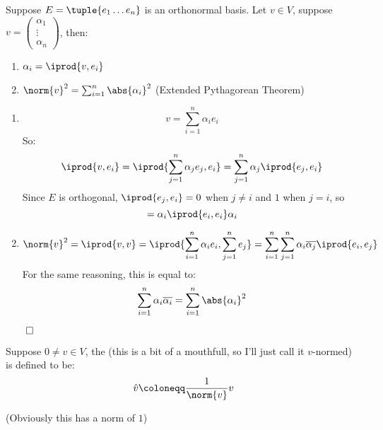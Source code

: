 \documentclass[10pt]{article}
\begin{document}
\begin{lemma}{Suppose $E=\tuple{e_1\dots e_n}$ is an orthonormal basis. Let $v\in V$, suppose $v=\begin{pmatrix}\alpha_1\\\vdots\\\alpha_n\end{pmatrix}$, then:
\begin{enumerate}
    \item $\alpha_i=\iprod{v,e_i}$
    \item $\norm{v}^2=\sum_{i=1}^n\abs{\alpha_i}^2$ (Extended Pythagorean Theorem)
\end{enumerate}}

\begin{enumerate}
    \item 
    \[ v=\sum_{i=1}^n\alpha_ie_i \]
    So:
    \[ \iprod{v,e_i}=\iprod{\sum_{j=1}^n\alpha_je_j,e_i}=\sum_{j=1}^n\alpha_j\iprod{e_j,e_i} \]
    Since $E$ is orthogonal, $\iprod{e_j,e_i}=0$ when $j\neq i$ and $1$ when $j=i$, so 
    \[ =\alpha_i\iprod{e_i,e_i}\alpha_i \]
    \item 
    \[ \norm{v}^2 = \iprod{v,v} = \iprod{\sum_{i=1}^n\alpha_ie_i,\sum_{j=1}^ne_j} = \sum_{i=1}^n\sum_{j=1}^n\alpha_i\overline{\alpha_j}\iprod{e_i,e_j} \]
    For the same reasoning, this is equal to:
    \[ \sum_{i=1}^n\alpha_i\overline{\alpha_i} = \sum_{i=1}^n\abs{\alpha_i}^2 \]
\end{enumerate}

$\qed$

\end{lemma}

\begin{definition}

Suppose $0\neq v\in V$, the  (this is a bit of a mouthfull, so I'll just call it $v$-normed) is defined to be:
 \[ \hat{v}\coloneqq\dfrac{1}{\norm{v}}v \]

(Obviously this has a norm of $1$)
\end{definition}
\end{document}
